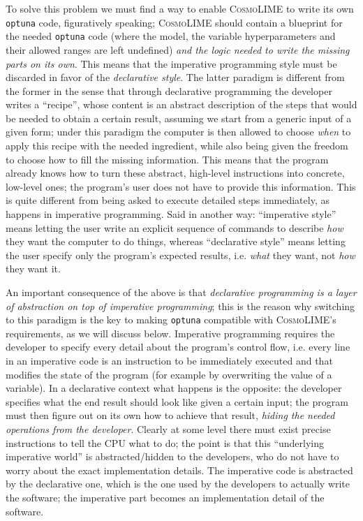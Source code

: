 To solve this problem we must find a way to enable \textsc{CosmoLIME} to write its own \texttt{optuna} code, figuratively speaking; \textsc{CosmoLIME} should contain a blueprint for the needed \texttt{optuna} code (where the model, the variable hyperparameters and their allowed ranges are left undefined) \emph{and the logic needed to write the missing parts on its own}. This means that the imperative programming style must be discarded in favor of the \emph{declarative style}. The latter paradigm is different from the former in the sense that through declarative programming the developer writes a ``recipe'', whose content is an abstract description of the steps that would be needed to obtain a certain result, assuming we start from a generic input of a given form; under this paradigm the computer is then allowed to choose \emph{when} to apply this recipe with the needed ingredient, while also being given the freedom to choose how to fill the missing information. This means that the program already knows how to turn these abstract, high-level instructions into concrete, low-level ones; the program's user does not have to provide this information. This is quite different from being asked to execute detailed steps immediately, as happens in imperative programming. Said in another way: ``imperative style'' means letting the user write an explicit sequence of commands to describe \emph{how} they want the computer to do things, whereas ``declarative style'' means letting the user specify only the program's expected results, i.e. \emph{what} they want, not \emph{how} they want it.

An important consequence of the above is that \emph{declarative programming is a layer of abstraction on top of imperative programming}; this is the reason why switching to this paradigm is the key to making \texttt{optuna} compatible with \textsc{CosmoLIME}'s requirements, as we will discuss below.
Imperative programming requires the developer to specify every detail about the program's control flow, i.e. every line in an imperative code is an instruction to be immediately executed and that modifies the state of the program (for example by overwriting the value of a variable). In a declarative context what happens is the opposite: the developer specifies what the end result should look like given a certain input; the program must then figure out on its own how to achieve that result, \emph{hiding the needed operations from the developer}. Clearly at some level there must exist precise instructions to tell the CPU what to do; the point is that this ``underlying imperative world'' is abstracted/hidden to the developers, who do not have to worry about the exact implementation details. The imperative code is abstracted by the declarative one, which is the one used by the developers to actually write the software; the imperative part becomes an implementation detail of the software.

